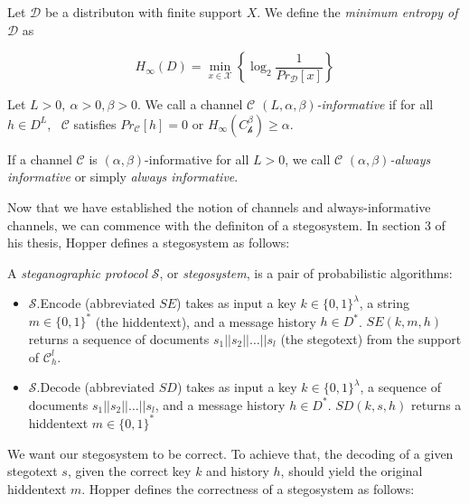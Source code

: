 \begin{definition}
Let $\mathcal{D}$ be a distributon with finite support $X$.
We define the \emph{minimum entropy of} $\mathcal{D}$ as

	$$H_{\infty}(D) = \min_{x \in \mathcal{X}}\left\{ \log_2 \frac{1}{ Pr_{\mathcal{D}}[x] } \right\}$$
\end{definition}

\begin{definition}
	Let $L > 0,~ \alpha > 0, \beta > 0$. 
	We call a channel \emph{$\mathcal{C}$ $(L, \alpha, \beta)$-informative} if for all $h \in D^L$,~ $\mathcal{C}$ satisfies $Pr_{\mathcal{C}}[h] = 0$ or $H_{\infty}(C_{\mathcal{h}}^\beta) \geq \alpha$.
	
	If a channel $\mathcal{C}$ is $(\alpha, \beta)$-informative for all $L > 0$, we call $\mathcal{C}$ \emph{$(\alpha, \beta)$-always informative} or simply \emph{always informative}.
\end{definition}

Now that we have established the notion of channels and always-informative channels, we can commence with the definiton of a stegosystem.
In section 3 of his thesis, Hopper defines a stegosystem as follows:

\begin{definition}
\label{def:stegosystem}
A \emph{steganographic protocol} $\mathcal{S}$, or \emph{stegosystem}, is a pair of probabilistic algorithms:

\begin{itemize}
	\item $\mathcal{S}$.Encode (abbreviated $SE$) takes as input a key $k \in \{0,1\}^\lambda$, a string $m \in \{0,1\}^*$ (the hiddentext), and a message history $h \in D^*$.
		$SE(k, m, h)$ returns a sequence of documents $s_1||s_2||\dots||s_l$ (the stegotext) from the support of $\mathcal{C}_h^l$.
	\item $\mathcal{S}$.Decode (abbreviated $SD$) takes as input a key $k \in \{0,1\}^\lambda$, a sequence of documents $s_1||s_2||\dots||s_l$, and a message history $h \in D^*$.
		$SD(k, s, h)$ returns a hiddentext $m \in \{0,1\}^*$
\end{itemize}
\end{definition}

We want our stegosystem to be correct.
To achieve that, the decoding of a given stegotext $s$, given the correct key $k$ and history $h$, should yield the original hiddentext $m$.
Hopper defines the correctness of a stegosystem as follows:

